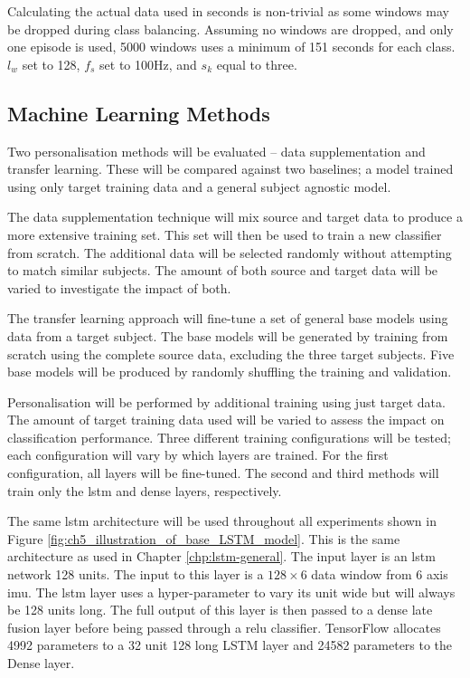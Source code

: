 Calculating the actual data used in seconds is non-trivial as some windows may be dropped during class balancing. Assuming no windows are dropped, and only one episode is used, 5000 windows uses a minimum of 151 seconds for each class. $l_w$ set to 128, $f_s$ set to 100Hz, and $s_k$ equal to three.

\subsection{Machine Learning Methods}
Two personalisation methods will be evaluated -- data supplementation and transfer learning. These will be compared against two baselines; a model trained using only target training data and a general subject agnostic model.

The data supplementation technique will mix source and target data to produce a more extensive training set. This set will then be used to train a new classifier from scratch. The additional data will be selected randomly without attempting to match similar subjects. The amount of both source and target data will be varied to investigate the impact of both.

The transfer learning approach will fine-tune a set of general base models using data from a target subject. The base models will be generated by training from scratch using the complete source data, excluding the three target subjects. Five base models will be produced by randomly shuffling the training and validation.

Personalisation will be performed by additional training using just target data. The amount of target training data used will be varied to assess the impact on classification performance. Three different training configurations will be tested; each configuration will vary by which layers are trained. For the first configuration, all layers will be fine-tuned. The second and third methods will train only the \acrshort{lstm} and dense layers, respectively.

The same \acrshort{lstm} architecture will be used throughout all experiments shown in Figure \ref{fig:ch5_illustration_of_base_LSTM_model}. This is the same architecture as used in Chapter \ref{chp:lstm-general}. The input layer is an \acrshort{lstm} network 128 units. The input to this layer is a $128 \times 6$ data window from 6 axis \acrshort{imu}. The \acrshort{lstm} layer uses a hyper-parameter to vary its unit wide but will always be 128 units long. The full output of this layer is then passed to a dense late fusion layer before being passed through a \acrshort{relu} classifier. TensorFlow allocates 4992 parameters to a 32 unit 128 long LSTM layer and 24582 parameters to the Dense layer.

